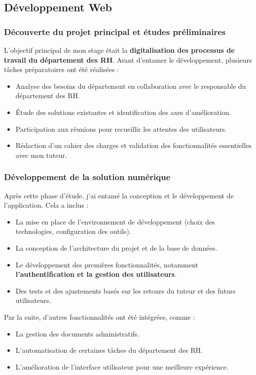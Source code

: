 \subsection{Développement Web}
\subsubsection{Découverte du projet principal et études préliminaires}
L'objectif principal de mon stage était la \textbf{digitalisation des processus de travail du département des \ac{RH}}. Avant d'entamer le développement, plusieurs tâches préparatoires ont été réalisées :




\begin{itemize}
    \item Analyse des besoins du département en collaboration avec le responsable du département des \ac{RH}.
    \item Étude des solutions existantes et identification des axes d'amélioration.
    \item Participation aux réunions pour recueillir les attentes des utilisateurs.
    \item Rédaction d'un cahier des charges et validation des fonctionnalités essentielles avec mon tuteur.
\end{itemize}

\subsubsection{Développement de la solution numérique}
Après cette phase d'étude, j'ai entamé la conception et le développement de l'application. Cela a inclus :
\begin{itemize}
    \item La mise en place de l'environnement de développement (choix des technologies, configuration des outils).
    \item La conception de l'architecture du projet et de la base de données.
    \item Le développement des premières fonctionnalités, notamment \textbf{ l'authentification et la gestion des utilisateurs}.
    \item Des tests et des ajustements basés sur les retours du tuteur et des futurs utilisateurs.

\end{itemize}
Par la suite, d'autres fonctionnalités ont été intégrées, comme :

\begin{itemize}
    \item La gestion des documents administratifs.
    \item L'automatisation de certaines tâches du département des \ac{RH}.
    \item L'amélioration de l'interface utilisateur pour une meilleure expérience.
\end{itemize}
